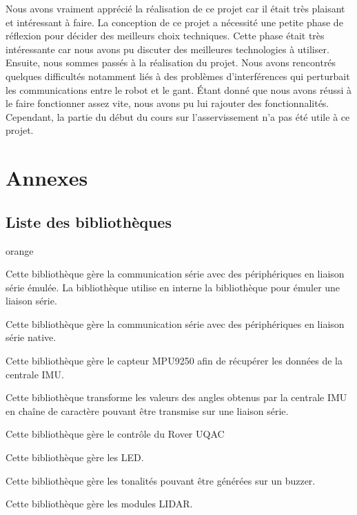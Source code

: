{Nous avons vraiment apprécié la réalisation de ce projet car il était très plaisant et intéressant à faire. La conception de ce projet a nécessité une petite phase de réflexion pour décider des meilleurs choix techniques. Cette phase était très intéressante car nous avons pu discuter des meilleures technologies à utiliser. 
Ensuite, nous sommes passés à la réalisation du projet. Nous avons rencontrés quelques difficultés notamment liés à des problèmes d'interférences qui perturbait les communications entre le robot et le gant. 
Étant donné que nous avons réussi à le faire fonctionner assez vite, nous avons pu lui rajouter des fonctionnalités.
Cependant, la partie du début du cours sur l'asservissement n'a pas été utile à ce projet.\chapter{Annexes}

\section{Liste des bibliothèques}

\begin{items}{orange}{\faFile}
    \item {}
    Cette bibliothèque gère la communication série avec des périphériques en liaison série émulée. La bibliothèque utilise en interne la bibliothèque  pour émuler une liaison série.
    \item {}
    Cette bibliothèque gère la communication série avec des périphériques en liaison série native.
    \item {}
    Cette bibliothèque gère le capteur MPU9250 afin de récupérer les données de la centrale IMU.
    \item {}
    Cette bibliothèque transforme les valeurs des angles obtenus par la centrale IMU en chaîne de caractère pouvant être transmise sur une liaison série.
    \item {}
    Cette bibliothèque gère le contrôle du Rover UQAC
    \item {}
    Cette bibliothèque gère les LED.
    \item {}
    Cette bibliothèque gère les tonalités pouvant être générées sur un buzzer.
    \item {}
    Cette bibliothèque gère les modules LIDAR.
\end{items}




}
